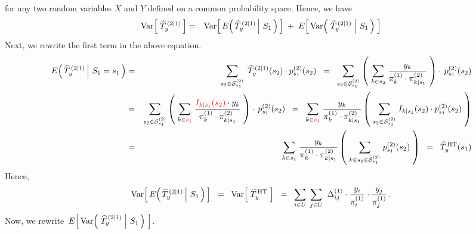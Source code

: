 \begin{enumerate}
\begin{equation*}
	\end{equation*}
	for any two random variables $X$ and $Y$ defined on a common probability space.
	Hence, we have
	\begin{eqnarray*}
	\textnormal{Var}\!\left[\;\widehat{T}^{\,(2 \vert 1)}_{y}\,\right]
	& = &
		\textnormal{Var}\!\left[\, E\!\left(\left.\widehat{T}^{\,(2 \vert 1)}_{y} \,\right\vert\, S_{1} \,\right) \,\right]
		\; + \;
		E\!\left[\, \textnormal{Var}\!\left(\, \left.\widehat{T}^{\,(2 \vert 1)}_{y} \;\right\vert\, S_{1} \,\right) \;\right]
	\end{eqnarray*}
	Next, we rewrite the first term in the above equation.
	\begin{eqnarray*}
	E\!\left(\left.\widehat{T}^{\,(2 \vert 1)}_{y} \,\right\vert\, S_{1} = s_{1} \,\right)
	& = &
		\underset{s_{2} \in \mathcal{S}^{(2)}_{s_{1}}}{\sum}\;\,
		\widehat{T}^{\,(2 \vert 1)}_{y}(s_{2}) \cdot p^{(2)}_{s_{1}}(s_{2})
	\;\; = \;\;
		\underset{s_{2} \in \mathcal{S}^{(2)}_{s_{1}}}{\sum}
		\left(\;
			\underset{k \in s_{2}}{\sum}\;\dfrac{y_{k}}{ \pi^{(1)}_{k} \cdot \pi^{(2)}_{k \vert s_{1}} }
		\;\right)
		\cdot\,
		p^{(2)}_{s_{1}}(s_{2})
	\\
	& = &
		\underset{s_{2} \in \mathcal{S}^{(2)}_{s_{1}}}{\sum}
		\left(\;
			\underset{k \in {\color{red}s_{1}}}{\sum}\;
			\dfrac{ {\color{red}I_{k \vert s_{1}}(s_{2})} \cdot y_{k} }{ \pi^{(1)}_{k} \cdot \pi^{(2)}_{k \vert s_{1}} }
		\;\right)
		\cdot\,
		p^{(2)}_{s_{1}}(s_{2})
	\;\; = \;\;
		\underset{k \in {\color{red}s_{1}}}{\sum}\;
		\dfrac{ y_{k} }{ \pi^{(1)}_{k} \cdot \pi^{(2)}_{k \vert s_{1}} }
			\left(\;
				\underset{s_{2} \in \mathcal{S}^{(2)}_{s_{1}}}{\sum}\;
				I_{k \vert s_{1}}(s_{2}) \cdot p^{(2)}_{s_{1}}(s_{2})
			\;\right)
	\\
	& = &
		\underset{k \in s_{1}}{\sum}\;
		\dfrac{ y_{k} }{ \pi^{(1)}_{k} \cdot \pi^{(2)}_{k \vert s_{1}} }
			\left(\;
				\underset{k \in s_{2} \in \mathcal{S}^{(2)}_{s_{1}}}{\sum}\; p^{(2)}_{s_{1}}(s_{2})
			\;\right)
	\;\; = \;\;
		\widehat{T}^{\,\textnormal{HT}}_{y}(s_{1})
	\end{eqnarray*}
	Hence,
	\begin{equation*}
	\textnormal{Var}\!\left[\, E\!\left(\left.\widehat{T}^{\,(2 \vert 1)}_{y} \,\right\vert\, S_{1} \,\right) \,\right]
	\;\; = \;\;
		\textnormal{Var}\!\left[\; \widehat{T}^{\,\textnormal{HT}}_{y} \;\right]
	\;\; = \;\;
		\underset{i \in U}{\sum}\;\,
		\underset{j \in U}{\sum}\;\;
			\Delta^{(1)}_{ij} \cdot \dfrac{y_{i}}{\pi^{(1)}_{i}} \cdot \dfrac{y_{j}}{\pi^{(1)}_{j}}\,.
	\end{equation*}
	Now, we rewrite \,$E\!\left[\, \textnormal{Var}\!\left(\, \left.\widehat{T}^{\,(2 \vert 1)}_{y} \;\right\vert\, S_{1} \,\right) \;\right]$.\,

\end{enumerate}
